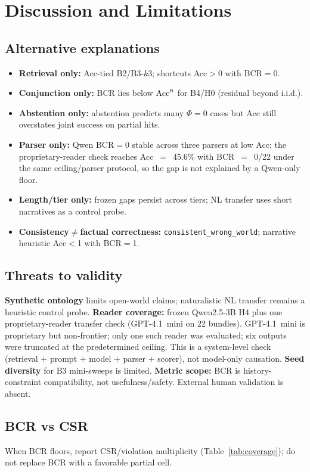 \section{Discussion and Limitations}
\label{sec:discussion}

\subsection{Alternative explanations}
\label{sec:alternatives}
\begin{itemize}[leftmargin=*,itemsep=1pt]
\item \textbf{Retrieval only:} Acc-tied B2/B3-$k3$; shortcuts Acc$>$0 with BCR$=$0.
\item \textbf{Conjunction only:} BCR lies below $\mathrm{Acc}^{n}$ for B4/H0 (residual beyond i.i.d.).
\item \textbf{Abstention only:} abstention predicts many $\Phi{=}0$ cases but Acc still overstates joint success on partial hits.
\item \textbf{Parser only:} Qwen BCR$=$0 stable across three parsers at low Acc; the proprietary-reader check reaches Acc~$=$~45.6\% with BCR~$=$~0/22 under the same ceiling/parser protocol, so the gap is not explained by a Qwen-only floor.
\item \textbf{Length/tier only:} frozen gaps persist across tiers; NL transfer uses short narratives as a control probe.
\item \textbf{Consistency$\neq$factual correctness:} \texttt{consistent\_wrong\_world}; narrative heuristic Acc$<$1 with BCR$=$1.
\end{itemize}

\subsection{Threats to validity}
\label{sec:threats}
\textbf{Synthetic ontology} limits open-world claims; naturalistic NL transfer remains a heuristic control probe.
\textbf{Reader coverage:} frozen Qwen2.5-3B H4 plus one proprietary-reader transfer check (GPT-4.1~mini on 22 bundles). GPT-4.1~mini is proprietary but non-frontier; only one such reader was evaluated; six outputs were truncated at the predetermined ceiling. This is a system-level check (retrieval $+$ prompt $+$ model $+$ parser $+$ scorer), not model-only causation.
\textbf{Seed diversity} for B3 mini-sweeps is limited.
\textbf{Metric scope:} BCR is history-constraint compatibility, not usefulness/safety.
External human validation is absent.

\subsection{BCR vs CSR}
When BCR floors, report CSR/violation multiplicity (Table~\ref{tab:coverage}); do not replace BCR with a favorable partial cell.
